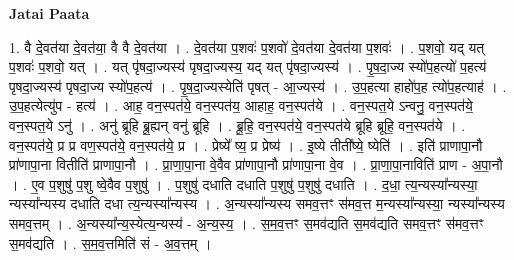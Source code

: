 \documentclass[17pt]{extarticle}
\begin{document}
\textbf{Jatai Paata} \newline

1. वै दे॒वत॑या दे॒वत॑या॒ वै वै दे॒वत॑या । . दे॒वत॑या प॒शवः॑ प॒शवो॑ दे॒वत॑या दे॒वत॑या प॒शवः॑ । . प॒शवो॒ यद् यत् प॒शवः॑ प॒शवो॒ यत् । . यत् पृ॑षदा॒ज्यस्य॑ पृषदा॒ज्यस्य॒ यद् यत् पृ॑षदा॒ज्यस्य॑ । . पृ॒ष॒दा॒ज्य स्यो॑प॒हत्यो॑ प॒हत्य॑ पृषदा॒ज्यस्य॑ पृषदा॒ज्य स्यो॑प॒हत्य॑ । . पृ॒ष॒दा॒ज्यस्येति॑ पृषत् - आ॒ज्यस्य॑ । . उ॒प॒हत्या हाहो॑प॒ह त्यो॑प॒हत्याह॑ । . उ॒प॒हत्येत्यु॑प - हत्य॑ । . आह॒ वन॒स्पत॑ये॒ वन॒स्पत॑य॒ आहाह॒ वन॒स्पत॑ये । . वन॒स्पत॒ये ऽन्वनु॒ वन॒स्पत॑ये॒ वन॒स्पत॒ये ऽनु॑ । . अनु॑ ब्रूहि ब्रू॒ह्यन् वनु॑ ब्रूहि । . ब्रू॒हि॒ वन॒स्पत॑ये॒ वन॒स्पत॑ये ब्रूहि ब्रूहि॒ वन॒स्पत॑ये । . वन॒स्पत॑ये॒ प्र प्र वण॒स्पत॑ये॒ वन॒स्पत॑ये॒ प्र । . प्रेष्ये᳚ ष्य॒ प्र प्रेष्य॑ । . इ॒ष्ये तीती᳚ष्ये॒ ष्येति॑ । . इति॑ प्राणापा॒नौ प्रा॑णापा॒ना वितीति॑ प्राणापा॒नौ । . प्रा॒णा॒पा॒ना वे॒वैव प्रा॑णापा॒नौ प्रा॑णापा॒ना वे॒व । . प्रा॒णा॒पा॒नाविति॑ प्राण - अ॒पा॒नौ । . ए॒व प॒शुषु॑ प॒शु ष्वे॒वैव प॒शुषु॑ । . प॒शुषु॑ दधाति दधाति प॒शुषु॑ प॒शुषु॑ दधाति । . द॒धा॒ त्य॒न्यस्या᳚न्यस्या॒ न्यस्या᳚न्यस्य दधाति दधा त्य॒न्यस्या᳚न्यस्य । . अ॒न्यस्या᳚न्यस्य समव॒त्तꣳ स॑मव॒त्त म॒न्यस्या᳚न्यस्या॒ न्यस्या᳚न्यस्य समव॒त्तम् । . अ॒न्यस्या᳚न्य॒स्येत्य॒न्यस्य॑ - अ॒न्य॒स्य॒ । . स॒म॒व॒त्तꣳ स॒मव॑द्यति स॒मव॑द्यति समव॒त्तꣳ स॑मव॒त्तꣳ स॒मव॑द्यति । . स॒म॒व॒त्तमिति॑ सं - अ॒व॒त्तम् । \newline
\end{document}
